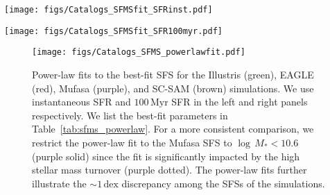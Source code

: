 \documentclass[preprint2,tighten]{aastex62}
\begin{document}
\begin{figure*}
\begin{center}
\texttt{[image: figs/Catalogs\_SFMSfit\_SFRinst.pdf]} 
\caption{Best-fit SFS of the central galaxies in the Illustris, EAGLE, {\sc Mufasa}, 
    and SC-SAM simulations as identified by our SFS GMM fitting method 
    (Section~\ref{sec:sfmsfit}). The SFSs above are fit from the instantaneous 
    SFR--$M_*$ relation. For reference, we include the best-fit SFS of the SDSS 
    sample in the top right panel. The uncertainties of the best-fit SFS are
    derived using bootstrap resampling. When we compare the SFS fits (bottom 
    right panel), we find that \emph{the SFSs of the simulations have similar 
    overall stellar mass dependence, but their amplitude vary roughly by an 
    order of magnitude.}} \label{fig:sfmsfit_inst}
\end{center}
\end{figure*}

\begin{figure*}
\begin{center}
\texttt{[image: figs/Catalogs\_SFMSfit\_SFR100myr.pdf]} 
    \caption{Same as Figure~\ref{fig:sfmsfit_inst} but for $100\,\mathrm{Myr}$ SFR. 
    As in Figure~\ref{fig:sfmsfit_inst}, \emph{the SFSs of the simulations have 
    similar stellar mass dependence but vary roughly by an order of magnitude in amplitude.}}
\label{fig:sfmsfit_100myr}
\end{center}
\end{figure*}

\begin{figure}
\begin{center}
\texttt{[image: figs/Catalogs\_SFMS\_powerlawfit.pdf]} 
\caption{Power-law fits to the best-fit SFS for the Illustris (green), 
    EAGLE (red), {\sc Mufasa} (purple), and SC-SAM (brown) simulations. 
    We use instantaneous SFR and $100\,\mathrm{Myr}$ SFR in the left
    and right panels respectively. We list the best-fit parameters 
    in Table~\ref{tab:sfms_powerlaw}. For a more consistent 
    comparison, we restrict the power-law fit to the {\sc Mufasa} SFS 
    to $\log\,M_* < 10.6$ (purple solid) since the fit is 
    significantly impacted by the high stellar mass turnover (purple dotted). 
    The power-law fits further illustrate the ${\sim}1\,\mathrm{dex}$ 
    discrepancy among the SFSs of the simulations.}
    \label{fig:sfmsfit_powerlaw}
\end{center}
\end{figure}
\end{document}
